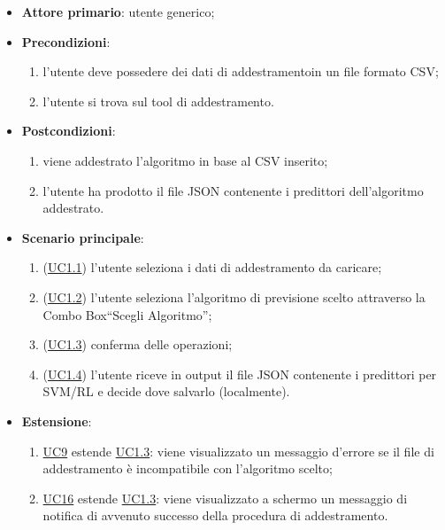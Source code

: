 		\begin{itemize}
			\item\textbf{Attore primario}: utente generico;
			\item\textbf{Precondizioni}:
				\begin{enumerate}
					\item l’utente deve possedere dei dati di addestramento\glo in un file formato CSV\glo;
					\item l’utente si trova sul tool di addestramento.
				\end{enumerate}
			\item\textbf{Postcondizioni}:
				\begin{enumerate}
					\item viene addestrato l'algoritmo in base al CSV inserito;
					\item l'utente ha prodotto il file JSON contenente i predittori dell'algoritmo addestrato.
				\end{enumerate}
			\item\textbf{Scenario principale}:
				\begin{enumerate}
					\item (\hyperref[par:UC1.1]{UC1.1}) l’utente seleziona i dati di addestramento da caricare;
					\item (\hyperref[par:UC1.2]{UC1.2}) l’utente seleziona l’algoritmo di previsione scelto attraverso la Combo Box\glo “Scegli Algoritmo”;
					\item (\hyperref[par:UC1.3]{UC1.3}) conferma delle operazioni;
					\item (\hyperref[par:UC1.4]{UC1.4}) l’utente riceve in output il file JSON contenente i predittori per SVM/RL e decide dove salvarlo (localmente).
				\end{enumerate}
			\item\textbf{Estensione}: 
\begin{enumerate}
\item\hyperref[par:UC9]{UC9} estende \hyperref[par:UC1.3]{UC1.3}: viene visualizzato un messaggio d’errore se il file di addestramento è incompatibile con l’algoritmo scelto;
			\item\hyperref[par:UC16]{UC16} estende \hyperref[par:UC1.3]{UC1.3}: viene visualizzato a schermo un messaggio di notifica di avvenuto successo della procedura di addestramento.
			\end{enumerate}
		\end{itemize}
		
		\label{par:UC1.1}
